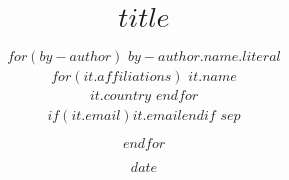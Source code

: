 \title{$title$}

\author{
  $for(by-author)$
    {$by-author.name.literal$} \\
    $for(it.affiliations)$
    $it.name$ \\
    $it.country$
    $endfor$ \\
    $if(it.email)$\href{mailto:$it.email$}{$it.email$}$endif$
    $sep$ \and 
  $endfor$}

  \date{$date$}

